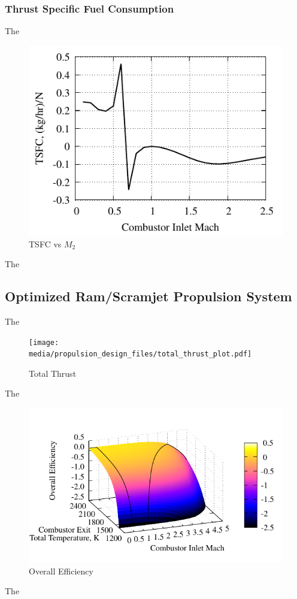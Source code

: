 \documentclass[conf]{new-aiaa} %
\begin{document}
\subsubsection{Thrust Specific Fuel Consumption}
The

\begin{figure}[H] %
    \centering
    \includegraphics[]{media/performance_parameter_files/part_h_TSFC.pdf}
    \caption{\label{fig:parthtsfc}TSFC vs \texorpdfstring{\textit{$M_2$}}{M2}}
\end{figure}
The

\subsection{Optimized Ram/Scramjet Propulsion System} %
The

\begin{figure}[H] %
    \centering
    \texttt{[image: media/propulsion\_design\_files/total\_thrust\_plot.pdf]}
    \caption{\label{fig:partithrust}Total Thrust}
\end{figure}
The

\begin{figure}[H] %
    \centering
    \includegraphics[]{media/propulsion_design_files/eta_o_plot.pdf}
    \caption{\label{fig:partietao}Overall Efficiency}
\end{figure}
The
\end{document}
